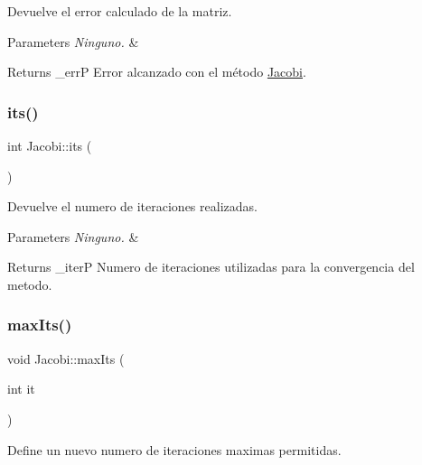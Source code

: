 Devuelve el error calculado de la matriz. 


\begin{DoxyParams}{Parameters}
{\em Ninguno.} & \\
\hline
\end{DoxyParams}
\begin{DoxyReturn}{Returns}
\+\_\+errP Error alcanzado con el método \hyperlink{class_jacobi}{Jacobi}. 
\end{DoxyReturn}
\hypertarget{class_jacobi_a4370d4024aee5a3224a76e87977e1cf3}{}\label{class_jacobi_a4370d4024aee5a3224a76e87977e1cf3} 
\subsubsection{\texorpdfstring{its()}{its()}}
{\footnotesize\ttfamily int Jacobi\+::its (\begin{DoxyParamCaption}{ }\end{DoxyParamCaption})\hspace{0.3cm}{\ttfamily [inline]}}



Devuelve el numero de iteraciones realizadas. 


\begin{DoxyParams}{Parameters}
{\em Ninguno.} & \\
\hline
\end{DoxyParams}
\begin{DoxyReturn}{Returns}
\+\_\+iterP Numero de iteraciones utilizadas para la convergencia del metodo. 
\end{DoxyReturn}
\hypertarget{class_jacobi_a4a493cb90b3ff37d68cea02bef85929a}{}\label{class_jacobi_a4a493cb90b3ff37d68cea02bef85929a} 
\subsubsection{\texorpdfstring{max\+Its()}{maxIts()}}
{\footnotesize\ttfamily void Jacobi\+::max\+Its (\begin{DoxyParamCaption}\item[{int}]{it }\end{DoxyParamCaption})\hspace{0.3cm}{\ttfamily [inline]}}



Define un nuevo numero de iteraciones maximas permitidas. 


